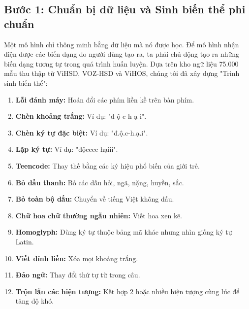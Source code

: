 \documentclass[12pt,a4paper]{article}
\begin{document}
\subsection{Bước 1: Chuẩn bị dữ liệu và Sinh biến thể phi chuẩn}
Một mô hình chỉ thông minh bằng dữ liệu mà nó được học. Để mô hình nhận diện được các biến dạng do người dùng tạo ra, ta phải chủ động tạo ra những biến dạng tương tự trong quá trình huấn luyện.
Dựa trên kho ngữ liệu 75.000 mẫu thu thập từ ViHSD, VOZ-HSD và ViHOS, chúng tôi đã xây dựng "Trình sinh biến thể":
\begin{enumerate}
    \item \textbf{Lỗi đánh máy:} Hoán đổi các phím liền kề trên bàn phím.
    \item \textbf{Chèn khoảng trắng:} Ví dụ: "đ ộ c h ạ i".
    \item \textbf{Chèn ký tự đặc biệt:} Ví dụ: "đ.ộ.c-h.ạ.i".
    \item \textbf{Lặp ký tự:} Ví dụ: "độcccc hạiii".
    \item \textbf{Teencode:} Thay thế bằng các ký hiệu phổ biến của giới trẻ.
    \item \textbf{Bỏ dấu thanh:} Bỏ các dấu hỏi, ngã, nặng, huyền, sắc.
    \item \textbf{Bỏ toàn bộ dấu:} Chuyển về tiếng Việt không dấu.
    \item \textbf{Chữ hoa chữ thường ngẫu nhiên:} Viết hoa xen kẽ.
    \item \textbf{Homoglyph:} Dùng ký tự thuộc bảng mã khác nhưng nhìn giống ký tự Latin.
    \item \textbf{Viết dính liền:} Xóa mọi khoảng trắng.
    \item \textbf{Đảo ngữ:} Thay đổi thứ tự từ trong câu.
    \item \textbf{Trộn lẫn các hiện tượng:} Kết hợp 2 hoặc nhiều hiện tượng cùng lúc để tăng độ khó.
\end{enumerate}
\end{document}
